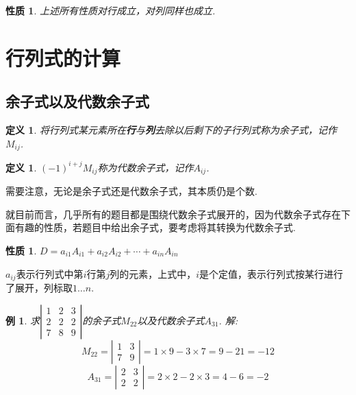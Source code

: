 \documentclass[12pt, a4paper, oneside]{ctexbook}
\newtheorem{definition}[theorem]{定义}
\newtheorem{example}[theorem]{例}
\newtheorem{quolity}[theorem]{性质}
\begin{document}
\begin{quolity}
    上述所有性质对行成立，对列同样也成立. 
\end{quolity}

\section{行列式的计算}

\subsection{余子式以及代数余子式}

\begin{definition}
    将行列式某元素所在\textbf{行}与\textbf{列}去除以后剩下的子行列式称为余子式，记作$M_{ij}$. 
\end{definition}

\begin{definition}
    $(-1)^{i+j}M_{ij}$称为代数余子式，记作$A_{ij}$. 
\end{definition}
需要注意，无论是余子式还是代数余子式，其本质仍是个数. 


就目前而言，几乎所有的题目都是围绕代数余子式展开的，因为代数余子式存在下面有趣的性质，若题目中给出余子式，要考虑将其转换为代数余子式. 

\begin{quolity}
    $D=a_{i1}A_{i1} + a_{i2}A_{i2} + \cdots + a_{in}A_{in}$
\end{quolity}
$a_{ij}$表示行列式中第$i$行第$j$列的元素，上式中，$i$是个定值，表示行列式按某行进行了展开，列标取$1 \dots n$. 

\begin{example}
    求$\left | \begin{matrix}
        1   & 2   & 3 \\
        2   & 2   & 2 \\
        7   & 8   & 9
    \end{matrix} \right |$的余子式$M_{22}$以及代数余子式$A_{31}$. 
    \newline
    解: $$M_{22} = \left | \begin{matrix}
        1 & 3 \\
        7 & 9
    \end{matrix} \right | = 1 \times 9 - 3 \times 7 = 9 - 21 = -12$$
    \newline
    $$A_{31} = \left | \begin{matrix}
        2 & 3 \\
        2 & 2
    \end{matrix} \right | = 2 \times 2 - 2 \times 3 = 4 - 6 = -2$$
\end{example}
\end{document}
